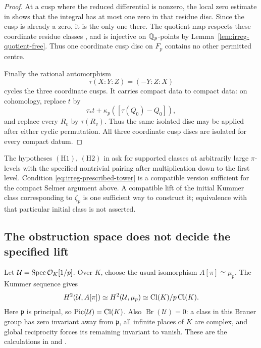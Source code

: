 \begin{proof}
At a cusp where the reduced differential is nonzero, the local
zero estimate in
\cite[Lemma 7, pp.~579--580]{McCallum1994}
shows that the integral has at most one zero in that residue disc.
Since the cusp is already a zero, it is the only one there.
The quotient map respects these coordinate residue classes
\cite[Lemma 8 and the proof of Theorem 1, p.~580]{McCallum1994},
and is injective on \(\mathbb Q_p\)-points by
Lemma~\ref{lem:irreg-quotient-free}. Thus one coordinate cusp disc
on \(F_p\) contains no other permitted centre.

Finally the rational automorphism
\[
 \tau(X:Y:Z)=(-Y:Z:X)
\]
cycles the three coordinate cusps. It carries compact data to
compact data: on cohomology, replace \(t\) by
\[
 \tau_*t+
 \kappa_p([\tau(Q_0)-Q_0]),
\]
and replace every \(R_v\) by \(\tau(R_v)\). Thus the same isolated
disc may be applied after either cyclic permutation. All three
coordinate cusp discs are isolated for every compact datum.
\end{proof}

The hypotheses \((\mathrm H1)\), \((\mathrm H2)\) in
\cite[p.~575]{McCallum1994} ask for supported classes at arbitrarily
large \(\pi\)-levels with the specified nontrivial pairing after
multiplication down to the first level. Condition
\eqref{eq:irreg-prescribed-tower} is a compatible version sufficient
for the compact Selmer argument above. A compatible lift of the
initial Kummer class corresponding to \(\zeta_p\) is one sufficient
way to construct it; equivalence with that particular initial
class is not asserted.

\subsection{The obstruction space does not decide the specified lift}

Let \(\mathcal U=\operatorname{Spec}\mathcal O_K[1/p]\). Over \(K\), choose the
usual isomorphism \(A[\pi]\simeq\mu_p\). The Kummer sequence gives
\begin{equation}
 H^2(\mathcal U,A[\pi])
 \simeq H^2(\mathcal U,\mu_p)
 \simeq\operatorname{Cl}(K)/p\operatorname{Cl}(K).
 \label{eq:irreg-obstruction-space}
\end{equation}
Here \(\mathfrak p\) is principal, so
\(\operatorname{Pic}(\mathcal U)=\operatorname{Cl}(K)\). Also
\(\operatorname{Br}(\mathcal U)=0\): a class in this Brauer group
has zero invariant away from \(\mathfrak p\), all infinite places
of \(K\) are complex, and global reciprocity forces its remaining
invariant to vanish. These are the calculations in
\cite[Section 5, Theorem 5, pp.~581--582]{McCallum1994} and
\cite[Lemma 6, pp.~401--402]{McCallum2001Brauer}.

